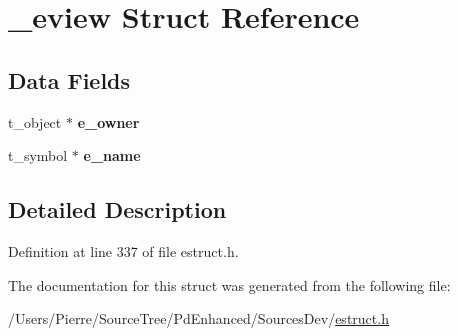 \hypertarget{struct__eview}{\section{\-\_\-eview Struct Reference}
\label{struct__eview}
}
\subsection*{Data Fields}
\begin{DoxyCompactItemize}
\item 
\hypertarget{struct__eview_a2a35e154dc0053b0c8078d322ee1b5e3}{t\-\_\-object $\ast$ {\bfseries e\-\_\-owner}}\label{struct__eview_a2a35e154dc0053b0c8078d322ee1b5e3}

\item 
\hypertarget{struct__eview_a6d8c2140844c7949fe9bc0384b2129d8}{t\-\_\-symbol $\ast$ {\bfseries e\-\_\-name}}\label{struct__eview_a6d8c2140844c7949fe9bc0384b2129d8}

\end{DoxyCompactItemize}


\subsection{Detailed Description}


Definition at line 337 of file estruct.\-h.



The documentation for this struct was generated from the following file\-:\begin{DoxyCompactItemize}
\item 
/\-Users/\-Pierre/\-Source\-Tree/\-Pd\-Enhanced/\-Sources\-Dev/\hyperlink{estruct_8h}{estruct.\-h}\end{DoxyCompactItemize}
